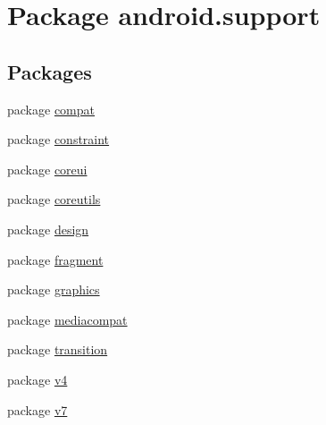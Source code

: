 \hypertarget{namespaceandroid_1_1support}{}\section{Package android.\+support}
\label{namespaceandroid_1_1support}
\subsection*{Packages}
\begin{DoxyCompactItemize}
\item 
package \mbox{\hyperlink{namespaceandroid_1_1support_1_1compat}{compat}}
\item 
package \mbox{\hyperlink{namespaceandroid_1_1support_1_1constraint}{constraint}}
\item 
package \mbox{\hyperlink{namespaceandroid_1_1support_1_1coreui}{coreui}}
\item 
package \mbox{\hyperlink{namespaceandroid_1_1support_1_1coreutils}{coreutils}}
\item 
package \mbox{\hyperlink{namespaceandroid_1_1support_1_1design}{design}}
\item 
package \mbox{\hyperlink{namespaceandroid_1_1support_1_1fragment}{fragment}}
\item 
package \mbox{\hyperlink{namespaceandroid_1_1support_1_1graphics}{graphics}}
\item 
package \mbox{\hyperlink{namespaceandroid_1_1support_1_1mediacompat}{mediacompat}}
\item 
package \mbox{\hyperlink{namespaceandroid_1_1support_1_1transition}{transition}}
\item 
package \mbox{\hyperlink{namespaceandroid_1_1support_1_1v4}{v4}}
\item 
package \mbox{\hyperlink{namespaceandroid_1_1support_1_1v7}{v7}}
\end{DoxyCompactItemize}
